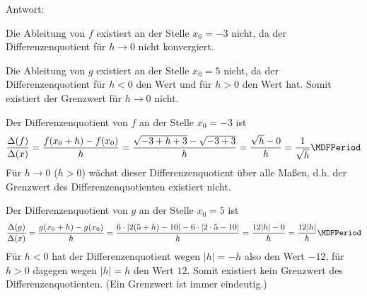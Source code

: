 \begin{MExercises}
\begin{MExercise}
Antwort:
\begin{MExerciseItems}
\item Die Ableitung von $f$ existiert an der Stelle $x_0 = -3$ nicht, 
da der Differenzenquotient 
für $h \rightarrow 0$ nicht konvergiert.
\item Die Ableitung von $g$ existiert an der Stelle $x_0 = 5$ nicht, da der 
Differenzenquotient für $h < 0$ den Wert 
 und für $h > 0$ den 
Wert {} hat. Somit existiert der Grenzwert für 
$h \rightarrow 0$ nicht.
\end{MExerciseItems}
\begin{MHint}{\iSolution}
 \begin{MExerciseItems}
  \item Der Differenzenquotient von $f$ an der Stelle $x_0 = - 3$ ist
  \[
  \frac{\Delta (f)}{\Delta (x)} = \frac{f(x_0 + h) - f(x_0)}{h} = \frac{\sqrt{-3 + h + 3} - \sqrt{-3 + 3}}{h}
  = \frac{\sqrt{h} - 0}{h} = \frac{1}{\sqrt{h}} \MDFPeriod
  \]
  Für $h \rightarrow 0$ ($h > 0$) wächst dieser Differenzenquotient über alle Ma{\ss}en, d.h. der Grenzwert des Differenzenquotienten existiert nicht.
  \item Der Differenzenquotient von $g$ an der Stelle $x_0 = 5$ ist
  \[
  \frac{\Delta (g)}{\Delta (x)} = \frac{g(x_0 + h) - g(x_0)}{h} = \frac{6 \cdot |2 (5+h) - 10| - 6 \cdot |2 \cdot 5 - 10|}{h}
  = \frac{12 |h| - 0}{h} = \frac{12 |h|}{h} \MDFPeriod
  \]
  Für $h<0$ hat der Differenzenquotient wegen $|h| = -h$ also den Wert $-12$, für $h>0$ dagegen wegen $|h|=h$ den Wert $12$. Somit existiert kein Grenzwert
  des Differenzenquotienten. (Ein Grenzwert ist immer eindeutig.)
 \end{MExerciseItems}
\end{MHint}
\end{MExercise}


\end{MExercises}




